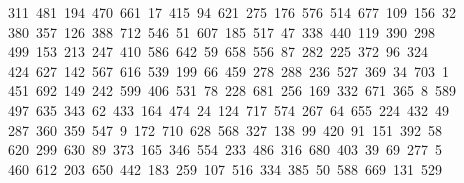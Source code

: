 \begin{tabbing}
\>\ 311\ 481\ 194\ 470\ 661\ 17\ 415\ 94\ 621\ 275\ 176\ 576\ 514\ 677\ 109\ 156\ 32\\[0pt]
\ 380\ 357\ 126\ 388\ 712\ 546\ 51\ 607\ 185\ 517\ 47\ 338\ 440\ 119\ 390\ 298\ \\[0pt]
\ 499\ 153\ 213\ 247\ 410\ 586\ 642\ 59\ 658\ 556\ 87\ 282\ 225\ 372\ 96\ 324\\[0pt]
\>\ 424\ 627\ 142\ 567\ 616\ 539\ 199\ 66\ 459\ 278\ 288\ 236\ 527\ 369\ 34\ 703\ 1\\[0pt]
\>\ 451\ 692\ 149\ 242\ 599\ 406\ 531\ 78\ 228\ 681\ 256\ 169\ 332\ 671\ 365\ 8\ 589\\[0pt]
\>\ 497\ 635\ 343\ 62\ 433\ 164\ 474\ 24\ 124\ 717\ 574\ 267\ 64\ 655\ 224\ 432\ 49\\[0pt]
\ 287\ 360\ 359\ 547\ 9\ 172\ 710\ 628\ 568\ 327\ 138\ 99\ 420\ 91\ 151\ 392\ 58\\[0pt]
\ 620\ 299\ 630\ 89\ 373\ 165\ 346\ 554\ 233\ 486\ 316\ 680\ 403\ 39\ 69\ 277\ 5\\[0pt]
\ 460\ 612\ 203\ 650\ 442\ 183\ 259\ 107\ 516\ 334\ 385\ 50\ 588\ 669\ 131\ 529\\[0pt]

\end{tabbing}
